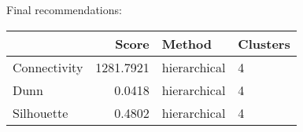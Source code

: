 \documentclass[11p]{article}
\begin{document}
Final recommendations:
\begin{table}[H]
\centering
\begin{tabular}{lrll}
\hline
& Score & Method & Clusters \\
\hline
Connectivity & 1281.7921 & hierarchical & 4 \\
Dunn & 0.0418 & hierarchical & 4 \\
Silhouette & 0.4802 & hierarchical & 4 \\
\hline
\end{tabular}
\end{table}

\newpage

%
\end{document}
